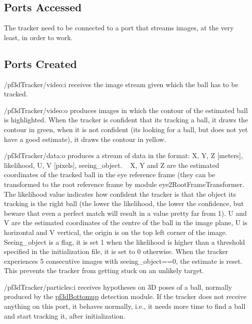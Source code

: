 \hypertarget{group__src__demoYoga_portsa_sec}{}\subsection{Ports Accessed}\label{group__src__demoYoga_portsa_sec}
The tracker need to be connected to a port that streams images, at the very least, in order to work.\hypertarget{group__src__demoYoga_portsc_sec}{}\subsection{Ports Created}\label{group__src__demoYoga_portsc_sec}

\begin{DoxyItemize}
\item /pf3d\+Tracker/video\+:i receives the image stream given which the ball has to be tracked.
\item /pf3d\+Tracker/video\+:o produces images in which the contour of the estimated ball is highlighted. When the tracker is confident that it\textquotesingle{}s tracking a ball, it draws the contour in green, when it is not confident (it\textquotesingle{}s looking for a ball, but does not yet have a good estimate), it draws the contour in yellow.
\item /pf3d\+Tracker/data\+:o produces a stream of data in the format\+: X, Y, Z \mbox{[}meters\mbox{]}, likelihood, U, V \mbox{[}pixels\mbox{]}, seeing\+\_\+object. ~\newline
 X, Y and Z are the estimated coordinates of the tracked ball in the eye reference frame (they can be transformed to the root reference frame by module eye2\+Root\+Frame\+Transformer. The likelihood value indicates how confident the tracker is that the object it\textquotesingle{}s tracking is the right ball (the lower the likelihood, the lower the confidence, but beware that even a perfect match will result in a value pretty far from 1). U and V are the estimated coordinates of the centre of the ball in the image plane, U is horizontal and V vertical, the origin is on the top left corner of the image. Seeing\+\_\+object is a flag, it is set 1 when the likelihood is higher than a threshold specified in the initialization file, it is set to 0 otherwise. When the tracker experiences 5 consecutive images with seeing\+\_\+object==0, the estimate is reset. This prevents the tracker from getting stuck on an unlikely target.
\item /pf3d\+Tracker/particles\+:i receives hypotheses on 3D poses of a ball, normally produced by the \hyperlink{group__icub__pf3dBottomup}{pf3d\+Bottomup} detection module. If the tracker does not receive anything on this port, it behaves normally, i.\+e., it needs more time to find a ball and start tracking it, after initialization.

\end{DoxyItemize}
